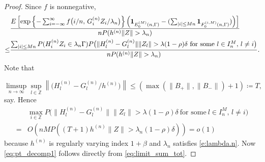 \documentclass[11pt,reqno]{amsart}
\numberwithin{equation}{section}
\theoremstyle{definition}
\theoremstyle{remark}
\theoremstyle{definition}
\newcommand{\ZZ}{\mathbb{Z}}
\newcommand{\bbz}{\ZZ}
\newcommand{\one}{{\bf 1}}
\begin{document}
\begin{proof}
 Since $f$ is nonnegative, 
 \begin{align*}
   &  \frac{E\left[\exp\left\{ -\sum_{i=-\infty}^\infty  f\big(i/n, \, G_i^{(n)}
  Z_i/\lambda_n\big)\right\} \left(\one_{E_0^{(M)}(n,\Gamma)} - (\sum_{|i|\leq Mn}\one_{F_0^{(i,M)}(n,\Gamma)})\right)\right]}
{n P(h^{(n)}\|Z\|>\lambda_n)} \\
   \leq & \frac{\sum_{|i| \leq Mn}P(H_i^{(n)} Z_i \in \lambda_n
          \Gamma) P\bigl(\|H_l^{(n)} -
          G_l^{(n)}\| \|Z_l\|> \lambda (1 - \rho)
          \delta \ \text{for some}  \ l\in I_n^M, \, l\not= i\bigr)}{nP(h^{(n)}\|Z\| > \lambda_n)}. 
 \end{align*}
 Note that 


\begin{equation*}%
    \limsup_{n\to \infty} \sup_{l\in\bbz }\left\|\bigl( H_l^{(n)} -
      G_l^{(n)}/h^{(n)}\bigr)\right\| \leq  \left(\max(\|B_+\|, \|B_-\|) + 1\right)\coloneqq T,
\end{equation*}
say.  Hence 
\begin{align*}
     & \max_{i\in \bbz}  P\bigl(\|H_l^{(n)} -
          G_l^{(n)}\| \|Z_l\|> \lambda (1 - \rho)
          \delta \ \text{for some}  \ l\in I_n^M, \, l\not= i\bigr)\\
    = & O(nM P((T+1)  h^{(n)} \|Z\| > \lambda_n (1 - \rho) \delta)) = o(1)
\end{align*}
because  $h^{(n)}$ is regularly varying index $1 + \beta$  and
$\lambda_n$ satisfies \eqref{e:lambda.n}. Now \eqref{eq:pt_decomp1}
follows directly from \eqref{eq:limit_sum_tot}.  



\end{proof}
\end{document}
